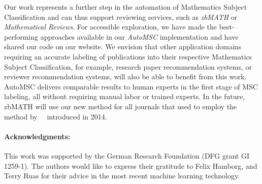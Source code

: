 Our work represents a further step in the automation of Mathematics Subject Classification and can thus support reviewing services, such as \emph{zbMATH} or \emph{Mathematical Reviews}.
For accessible exploration, we have made the best-performing approaches available in our \emph{AutoMSC} implementation and have shared our code on our website.
We envision that other application domains requiring an accurate labeling of publications into their respective Mathematics Subject Classification, for example, research paper recommendation systems, or reviewer recommendation systems, will also be able to benefit from this work.
AutoMSC delivers comparable results to human experts in the first stage of MSC labeling, all without requiring manual labor or trained experts.
In the future, zbMATH will use our new method for all journals that used to employ the method by~\citeauthor{SchonebergS14}~\cite{SchonebergS14} introduced in 2014.


\paragraph{Acknowledgments:} This work was supported by the German Research Foundation (DFG grant GI 1259-1).
The authors would like to express their gratitude to Felix Hamborg, and Terry Ruas for their advice in the most recent machine learning technology.
\printbibliography[keyword=primary]
